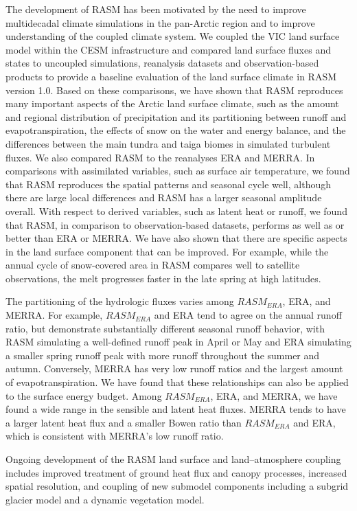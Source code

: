 The development of RASM has been motivated by the need to improve multidecadal climate simulations in the pan-Arctic region and to improve understanding of the coupled climate system.
We coupled the VIC land surface model within the CESM infrastructure and compared land surface fluxes and states to uncoupled simulations, reanalysis datasets and observation-based products to provide a baseline evaluation of the land surface climate in RASM version 1.0.
Based on these comparisons, we have shown that RASM reproduces many important aspects of the Arctic land surface climate, such as the amount and regional distribution of precipitation and its partitioning between runoff and evapotranspiration, the effects of snow on the water and energy balance, and the differences between the main tundra and taiga biomes in simulated turbulent fluxes.
We also compared RASM to the reanalyses ERA and MERRA.
In comparisons with assimilated variables, such as surface air temperature, we found that RASM reproduces the spatial patterns and seasonal cycle well, although there are large local differences and RASM has a larger seasonal amplitude overall.
With respect to derived variables, such as latent heat or runoff, we found that RASM, in comparison to observation-based datasets, performs as well as or better than ERA or MERRA.
We have also shown that there are specific aspects in the land surface component that can be improved.
For example, while the annual cycle of snow-covered area in RASM compares well to satellite observations, the melt progresses faster in the late spring at high latitudes.

The partitioning of the hydrologic fluxes varies among $RASM_{ERA}$, ERA, and MERRA.
For example, $RASM_{ERA}$ and ERA tend to agree on the annual runoff ratio, but demonstrate substantially different seasonal runoff behavior, with RASM simulating a well-defined runoff peak in April or May and ERA simulating a smaller spring runoff peak with more runoff throughout the summer and autumn.
Conversely, MERRA has very low runoff ratios and the largest amount of evapotranspiration.
We have found that these relationships can also be applied to the surface energy budget.
Among $RASM_{ERA}$, ERA, and MERRA, we have found a wide range in the sensible and latent heat fluxes.
MERRA tends to have a larger latent heat flux and a smaller Bowen ratio than $RASM_{ERA}$ and ERA, which is consistent with MERRA’s low runoff ratio.

Ongoing development of the RASM land surface and land–atmosphere coupling includes improved treatment of ground heat flux and canopy processes, increased spatial resolution, and coupling of new submodel components including a subgrid glacier model and a dynamic vegetation model.

